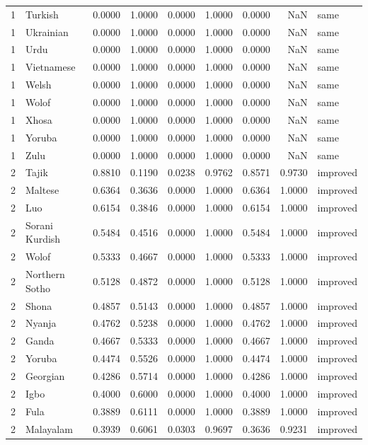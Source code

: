 \begin{tabular}{rlrrrrrrl}
1 & Turkish & 0.0000 & 1.0000 & 0.0000 & 1.0000 & 0.0000 & NaN & same \\
1 & Ukrainian & 0.0000 & 1.0000 & 0.0000 & 1.0000 & 0.0000 & NaN & same \\
1 & Urdu & 0.0000 & 1.0000 & 0.0000 & 1.0000 & 0.0000 & NaN & same \\
1 & Vietnamese & 0.0000 & 1.0000 & 0.0000 & 1.0000 & 0.0000 & NaN & same \\
1 & Welsh & 0.0000 & 1.0000 & 0.0000 & 1.0000 & 0.0000 & NaN & same \\
1 & Wolof & 0.0000 & 1.0000 & 0.0000 & 1.0000 & 0.0000 & NaN & same \\
1 & Xhosa & 0.0000 & 1.0000 & 0.0000 & 1.0000 & 0.0000 & NaN & same \\
1 & Yoruba & 0.0000 & 1.0000 & 0.0000 & 1.0000 & 0.0000 & NaN & same \\
1 & Zulu & 0.0000 & 1.0000 & 0.0000 & 1.0000 & 0.0000 & NaN & same \\
2 & Tajik & 0.8810 & 0.1190 & 0.0238 & 0.9762 & 0.8571 & 0.9730 & improved \\
2 & Maltese & 0.6364 & 0.3636 & 0.0000 & 1.0000 & 0.6364 & 1.0000 & improved \\
2 & Luo & 0.6154 & 0.3846 & 0.0000 & 1.0000 & 0.6154 & 1.0000 & improved \\
2 & Sorani Kurdish & 0.5484 & 0.4516 & 0.0000 & 1.0000 & 0.5484 & 1.0000 & improved \\
2 & Wolof & 0.5333 & 0.4667 & 0.0000 & 1.0000 & 0.5333 & 1.0000 & improved \\
2 & Northern Sotho & 0.5128 & 0.4872 & 0.0000 & 1.0000 & 0.5128 & 1.0000 & improved \\
2 & Shona & 0.4857 & 0.5143 & 0.0000 & 1.0000 & 0.4857 & 1.0000 & improved \\
2 & Nyanja & 0.4762 & 0.5238 & 0.0000 & 1.0000 & 0.4762 & 1.0000 & improved \\
2 & Ganda & 0.4667 & 0.5333 & 0.0000 & 1.0000 & 0.4667 & 1.0000 & improved \\
2 & Yoruba & 0.4474 & 0.5526 & 0.0000 & 1.0000 & 0.4474 & 1.0000 & improved \\
2 & Georgian & 0.4286 & 0.5714 & 0.0000 & 1.0000 & 0.4286 & 1.0000 & improved \\
2 & Igbo & 0.4000 & 0.6000 & 0.0000 & 1.0000 & 0.4000 & 1.0000 & improved \\
2 & Fula & 0.3889 & 0.6111 & 0.0000 & 1.0000 & 0.3889 & 1.0000 & improved \\
2 & Malayalam & 0.3939 & 0.6061 & 0.0303 & 0.9697 & 0.3636 & 0.9231 & improved \\

\end{tabular}
